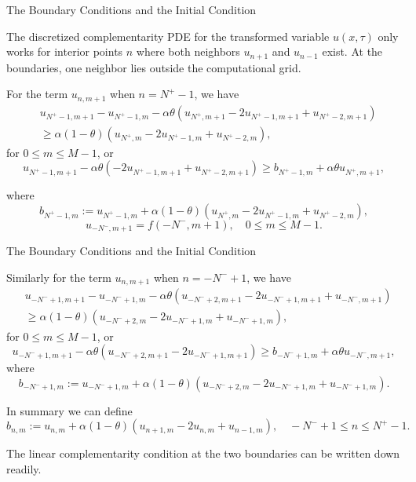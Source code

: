 \documentclass{beamer}
\begin{document}
\begin{frame}{The Boundary Conditions and the Initial Condition}

    {\footnotesize \footnotesize
    The discretized complementarity PDE for the transformed variable $u(x,\tau)$ only works for interior points
    $n$ where both neighbors $u_{n+1}$ and $u_{n-1}$ exist. 
    At the boundaries, one neighbor lies outside the computational grid.
    \vspace{1em}

    For the term $u_{n,m+1}$ when $n = N^{+} - 1$, we have
    \begin{align*}
    &u_{N^{+}-1,m+1} - u_{N^{+}-1,m} - \alpha \theta (u_{N^{+},m+1} - 2u_{N^{+}-1,m+1} + u_{N^{+}-2,m+1}) \\
    &\geq \alpha(1 - \theta) (u_{N^{+},m} - 2u_{N^{+}-1,m} + u_{N^{+}-2,m}), 
    \end{align*}
    for $0 \leq m \leq M - 1$, or
    \[
    u_{N^{+}-1,m+1} - \alpha \theta (-2u_{N^{+}-1,m+1} + u_{N^{+}-2,m+1}) \geq b_{N^{+}-1,m} + 
    \alpha \theta u_{N^{+},m+1},
    \]

    where
    \[
    b_{N^{+}-1,m} := u_{N^{+}-1,m} + \alpha (1 - \theta) (u_{N^{+},m} - 2u_{N^{+}-1,m} + u_{N^{+}-2,m}),
    \]
    \[
    u_{-N^{-},m+1} = f(-N^{-},m+1), \quad 0 \leq m \leq M - 1.
    \]
    }
    
    
\end{frame}

\begin{frame}{The Boundary Conditions and the Initial Condition}

    {\footnotesize \footnotesize
    Similarly for the term $u_{n,m+1}$ when $n = -N^{-} + 1$, we have
    \begin{align*}
    &u_{-N^{-}+1,m+1} - u_{-N^{-}+1,m} - \alpha \theta (u_{-N^{-}+2,m+1} - 2u_{-N^{-}+1,m+1} + u_{-N^{-},m+1}) \\
    &\geq \alpha (1 - \theta) (u_{-N^{-}+2,m} - 2u_{-N^{-}+1,m} + u_{-N^{-}+1,m}),
    \end{align*}
    for $0 \leq m \leq M - 1$, or
    \[
    u_{-N^{-}+1,m+1} - \alpha \theta (u_{-N^{-}+2,m+1} - 2u_{-N^{-}+1,m+1}) 
    \geq b_{-N^{-}+1,m} + \alpha \theta u_{-N^{-},m+1}, 
    \]
    where
    \[
    b_{-N^{-}+1,m} := u_{-N^{-}+1,m} + \alpha (1 - \theta) (u_{-N^{-}+2,m} - 2u_{-N^{-}+1,m} + u_{-N^{-}+1,m}).
    \]

    In summary we can define
    \[
    b_{n,m} := u_{n,m} + \alpha (1 - \theta) (u_{n+1,m} - 2u_{n,m} + u_{n-1,m}),
    \quad -N^{-} + 1 \leq n \leq N^{+} - 1. 
    \]

    The linear complementarity condition at the two boundaries can be written down readily.

    }
    
    
\end{frame}
\end{document}
